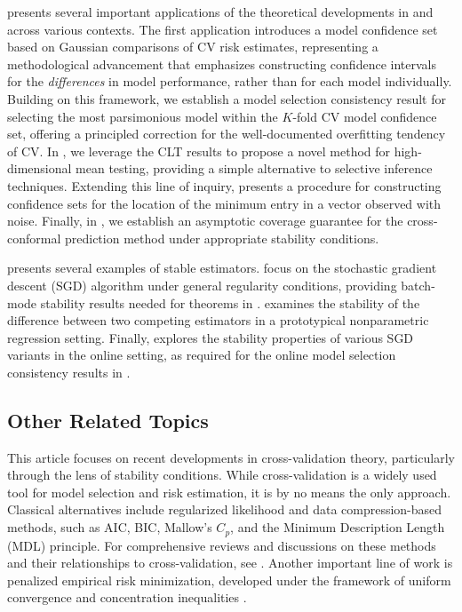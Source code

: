 \documentclass[11pt]{article}
\theoremstyle{plain}
\begin{document}
 presents several important applications of the theoretical developments in  and  across various contexts. The first application introduces a model confidence set based on Gaussian comparisons of CV risk estimates, representing a methodological advancement that emphasizes constructing confidence intervals for the \emph{differences} in model performance, rather than for each model individually. Building on this framework, we establish a model selection consistency result for selecting the most parsimonious model within the $K$-fold CV model confidence set, offering a principled correction for the well-documented overfitting tendency of CV. In , we leverage the CLT results to propose a novel method for high-dimensional mean testing, providing a simple alternative to selective inference techniques. Extending this line of inquiry,  presents a procedure for constructing confidence sets for the location of the minimum entry in a vector observed with noise. Finally, in , we establish an asymptotic coverage guarantee for the cross-conformal prediction method under appropriate stability conditions.

 presents several examples of stable estimators.  focus on the stochastic gradient descent (SGD) algorithm under general regularity conditions, providing batch-mode stability results needed for theorems in .  examines the stability of the difference between two competing estimators in a prototypical nonparametric regression setting. Finally,  explores the stability properties of various SGD variants in the online setting, as required for the online model selection consistency results in .

\subsection{Other Related Topics}
 This article focuses on recent developments in cross-validation theory, particularly through the lens of stability conditions. While cross-validation is a widely used tool for model selection and risk estimation, it is by no means the only approach. Classical alternatives include regularized likelihood and data compression-based methods, such as AIC, BIC, Mallow's \( C_p \), and the Minimum Description Length (MDL) principle. For comprehensive reviews and discussions on these methods and their relationships to cross-validation, see \cite{shao1997asymptotic,ding2018model}. Another important line of work is penalized empirical risk minimization, developed under the framework of uniform convergence and concentration inequalities \citep{bartlett2002model}.
\end{document}
